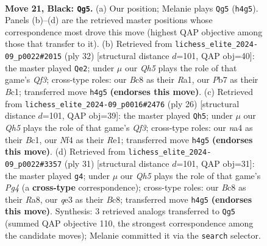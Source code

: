 \documentclass[11pt]{article}
\begin{document}
\clearpage

\begin{figure}[p]\centering
\begin{subfigure}{0.46\textwidth}\centering
\resizebox{\linewidth}{!}{%
\newchessgame
\chessboard[
  setfen={r1br4/ppp2pk1/3p4/4b2p/N1P1Pn1q/4Q1Pp/PP3P2/RBB1R1K1 b - - 0 21},
  showmover=false,
  pgfstyle=straightmove, color=movearrow, markmove={h4-g5}
]}
\caption{}
\end{subfigure}\hfill
\begin{subfigure}{0.46\textwidth}\centering
\resizebox{\linewidth}{!}{%
\newchessgame
\chessboard[
  setfen={r1b2rk1/1pq2ppp/p2b1n2/8/4p3/1BP2Q1P/PPN2PP1/R1B1R1K1 w - - 0 17},
  showmover=false,
  pgfstyle=straightmove, color=movearrow, markmove={f3-e2}
]}
\caption{}
\end{subfigure}
\\[4pt]
\begin{subfigure}{0.46\textwidth}\centering
\resizebox{\linewidth}{!}{%
\newchessgame
\chessboard[
  setfen={r1b1k1nr/1p1pqpbp/p7/2pBP3/3n4/2N2Q2/PPP2PPP/R1B1R1K1 w kq - 3 14},
  showmover=false,
  pgfstyle=straightmove, color=movearrow, markmove={f3-h5}
]}
\caption{}
\end{subfigure}\hfill
\begin{subfigure}{0.46\textwidth}\centering
\resizebox{\linewidth}{!}{%
\newchessgame
\chessboard[
  setfen={r1bq1k1r/ppp2n2/3p1b1p/6p1/2P1QP2/6PN/PP4BP/R1B2RK1 b - - 0 16},
  showmover=false,
  pgfstyle=straightmove, color=movearrow, markmove={g5-g4}
]}
\caption{}
\end{subfigure}
\caption{\textbf{Move 21, Black: \texttt{Qg5}.} (a) Our position; Melanie plays \texttt{Qg5} (\texttt{h4g5}). Panels (b)--(d) are the retrieved master positions whose correspondence most drove this move (highest QAP objective among those that transfer to it). (b) Retrieved from \texttt{lichess\_elite\_2024-09\_p0022\#2015} (ply 32) [structural distance $d$=101, QAP obj=40]: the master played \texttt{Qe2}; under $\mu$ our \emph{Qh5} plays the role of that game's \emph{Qf3}; cross-type roles: our \emph{B}c8 as their \emph{R}a1, our \emph{P}b7 as their \emph{B}c1; transferred move \texttt{h4g5} \textbf{(endorses this move)}. (c) Retrieved from \texttt{lichess\_elite\_2024-09\_p0016\#2476} (ply 26) [structural distance $d$=101, QAP obj=39]: the master played \texttt{Qh5}; under $\mu$ our \emph{Qh5} plays the role of that game's \emph{Qf3}; cross-type roles: our \emph{n}a4 as their \emph{B}c1, our \emph{N}f4 as their \emph{R}e1; transferred move \texttt{h4g5} \textbf{(endorses this move)}. (d) Retrieved from \texttt{lichess\_elite\_2024-09\_p0022\#3357} (ply 31) [structural distance $d$=101, QAP obj=31]: the master played \texttt{g4}; under $\mu$ our \emph{Qh5} plays the role of that game's \emph{Pg4} (a \textbf{cross-type} correspondence); cross-type roles: our \emph{B}c8 as their \emph{R}a8, our \emph{q}e3 as their \emph{B}c8; transferred move \texttt{h4g5} \textbf{(endorses this move)}. Synthesis: 3 retrieved analogs transferred to \texttt{Qg5} (summed QAP objective 110, the strongest correspondence among the candidate moves); Melanie committed it via the \texttt{search} selector.}
\label{fig:thought-m41}
\end{figure}
\end{document}
